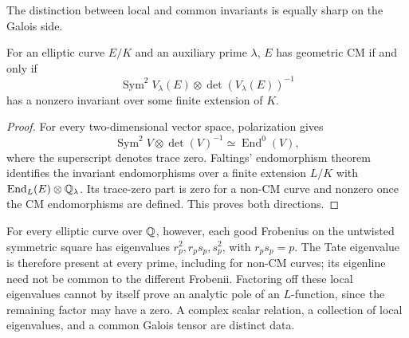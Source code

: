 The distinction between local and common invariants is equally
sharp on the Galois side.
\begin{proposition}\label{prop:galois-tensor}
For an elliptic curve $E/K$ and an auxiliary prime $\lambda$,
$E$ has geometric CM if and only if
\[
           \operatorname{Sym}^2V_\lambda(E)\otimes
                       \det(V_\lambda(E))^{-1}
\]
has a nonzero invariant over some finite extension of $K$.
\end{proposition}
\begin{proof}
For every two-dimensional vector space, polarization gives
\[
             \operatorname{Sym}^2V\otimes\det(V)^{-1}
                           \simeq\operatorname{End}^0(V),
\]
where the superscript denotes trace zero.  Faltings' endomorphism
theorem \cite{Faltings} identifies the invariant endomorphisms
over a finite extension $L/K$ with
$\operatorname{End}_L(E)\otimes\mathbb Q_\lambda$.
Its trace-zero part is zero for a non-CM curve and nonzero once
the CM endomorphisms are defined.  This proves both directions.
\end{proof}
For every elliptic curve over $\mathbb Q$, however, each good Frobenius
on the untwisted symmetric square has eigenvalues
$r_p^2,r_ps_p,s_p^2$, with $r_ps_p=p$.  The Tate eigenvalue is
therefore present at every prime, including for non-CM curves;
its eigenline need not be common to the different Frobenii.
Factoring off these local eigenvalues cannot by itself prove an
analytic pole of an $L$-function, since the remaining factor may
have a zero.  A complex scalar relation, a collection of local
eigenvalues, and a common Galois tensor are distinct data.
